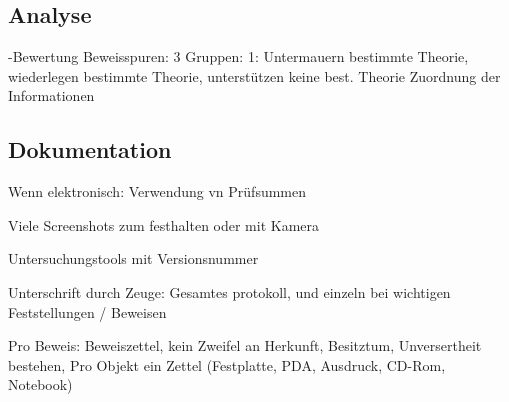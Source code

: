 \subsection{Analyse}
-Bewertung Beweisspuren: 3 Gruppen: 1: Untermauern bestimmte Theorie, wiederlegen bestimmte Theorie, unterstützen keine best. Theorie
Zuordnung der Informationen


\subsection{Dokumentation}
Wenn elektronisch: Verwendung vn Prüfsummen

Viele Screenshots zum festhalten oder mit Kamera

Untersuchungstools mit Versionsnummer

Unterschrift durch Zeuge: Gesamtes protokoll, und einzeln bei wichtigen Feststellungen / Beweisen

Pro Beweis: Beweiszettel, kein Zweifel an Herkunft, Besitztum, Unversertheit bestehen, Pro Objekt ein Zettel (Festplatte, PDA, Ausdruck, CD-Rom, Notebook)
